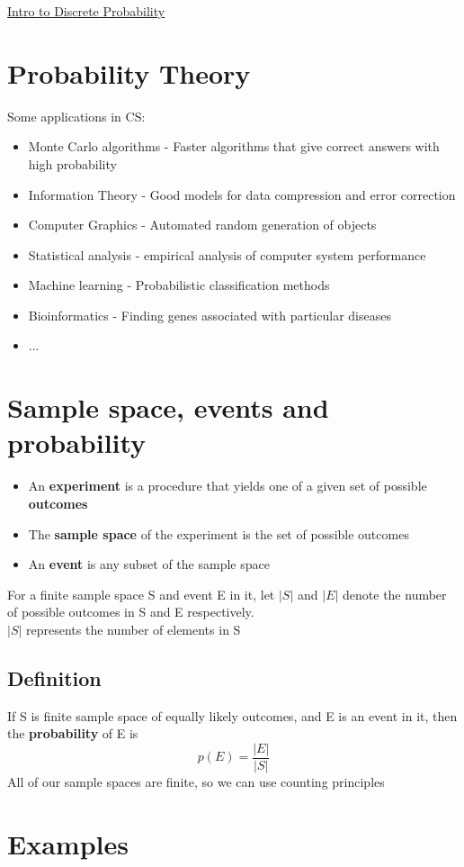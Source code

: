 \documentclass{article}[18pt]
\begin{document}
\begin{center}
\underline{\huge Intro to Discrete Probability}
\end{center}

\section{Probability Theory}
Some applications in CS:
\begin{itemize}
	\item Monte Carlo algorithms - Faster algorithms that give correct answers with high probability
	\item Information Theory - Good models for data compression and error correction
	\item Computer Graphics - Automated random generation of objects
	\item Statistical analysis - empirical analysis of computer system performance 
	\item Machine learning - Probabilistic classification methods
	\item Bioinformatics - Finding genes associated with particular diseases
	\item ...
\end{itemize}
\section{Sample space, events and probability}
\begin{itemize}
	\item An \textbf{experiment} is a procedure that yields one of a given set of possible \textbf{outcomes}
	\item The \textbf{sample space} of the experiment is the set of possible outcomes
	\item An \textbf{event} is any subset of the sample space
\end{itemize}
For a finite sample space S and event E in it, let $|S|$ and $|E|$ denote the number of possible outcomes in S and E respectively.\\
$|S|$ represents the number of elements in S
\subsection{Definition}
If S is finite sample space of equally likely outcomes, and E is an event in it, then the \textbf{probability} of E is
$$p(E)=\dfrac{|E|}{|S|}$$
All of our sample spaces are finite, so we can use counting principles
\section{Examples}
\end{document}
